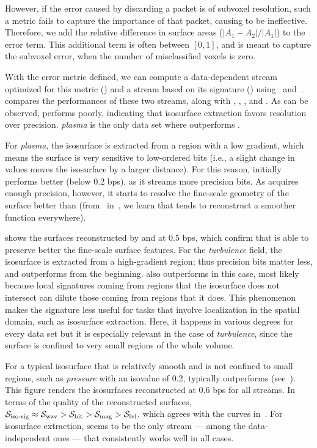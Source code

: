 However, if the error caused by discarding a packet is of subvoxel resolution, such a metric fails
to capture the importance of that packet, causing \siop to be ineffective. Therefore, we add the
relative difference in surface areas ($|A_1-A_2|/|A_1|$) to the error term. This additional term is
often between $[0, 1]$, and is meant to capture the subvoxel error, when the number of misclassified
voxels is zero.

With the error metric defined, we can compute a data-dependent stream optimized for this metric
(\siop) and a stream based on its signature (\sisg) using~
and~.  compares the performances of these two
streams, along with \sbit, \slvl, \swav, and \smag. As can be observed, \slvl performs poorly,
indicating that isosurface extraction favors resolution over precision. \emph{plasma} is the only
data set where \sbit outperforms \swav.

For \emph{plasma}, the isosurface is extracted from a region with a low gradient, which means the
surface is very sensitive to low-ordered bits (i.e., a slight change in values moves the isosurface
by a larger distance). For this reason, \swav initially performs better (below 0.2 bps), as it
streams more precision bits. As \sbit acquires enough precision, however, it starts to resolve the
fine-scale geometry of the surface better than \swav
(from~ in~, we learn that \swav
tends to reconstruct a smoother function everywhere).

 shows the surfaces reconstructed by \sbit
and \swav at 0.5 bps, which confirm that \sbit is able to preserve better the fine-scale surface
features. For the \emph{turbulence} field, the isosurface is extracted from a high-gradient region;
thus precision bits matter less, and \sbit outperforms \swav from the beginning. \sbit also
outperforms \sisg in this case, most likely because local signatures coming from regions that the
isosurface does not intersect can dilute those coming from regions that it does. This phenomenon
makes the signature less useful for tasks that involve localization in the spatial domain, such as
isosurface extraction. Here, it happens in various degrees for every data set but it is especially
relevant in the case of \emph{turbulence}, since the surface is confined to very small regions of
the whole volume.

For a typical isosurface that is relatively smooth and is not confined to small regions, such as
\emph{pressure} with an isovalue of 0.2, \swav typically outperforms \sbit
(see~). This figure renders the isosurfaces reconstructed at
0.6 bps for all streams. In terms of the quality of the reconstructed surfaces, $\sisg \approx \swav
> \sbit > \smag > \slvl$, which agrees with the curves in~. For
isosurface extraction, \swav seems to be the only stream --- among the data-independent ones ---
that consistently works well in all cases.
